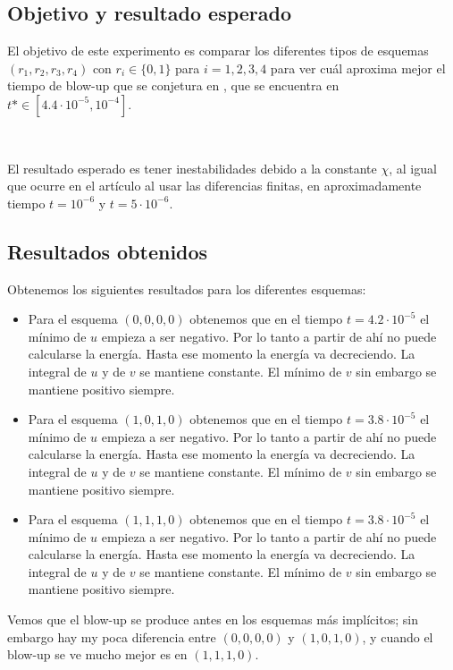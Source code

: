 \documentclass[a4paper,12pt]{article}
\begin{document}
\subsection{Objetivo y resultado esperado}
El objetivo de este experimento es comparar los diferentes tipos de esquemas $(r_1,r_2,r_3,r_4)$ con $r_i\in\{0,1\}$ para $i=1,2,3,4$ para ver cuál aproxima mejor el tiempo de blow-up que se conjetura en \cite{bib:2}, que se encuentra en $t*\in[4.4\cdot 10^{-5},10^{-4}]$.

\
 
El resultado esperado es tener inestabilidades debido a la constante $\chi$, al igual que ocurre en el artículo al usar las diferencias finitas, en  aproximadamente tiempo $t=10^{-6}$ y $t=5\cdot 10^{-6}$. 

\subsection{Resultados obtenidos}
Obtenemos los siguientes resultados para los diferentes esquemas: 
\begin{itemize}
	
	\item Para el esquema $(0,0,0,0)$ obtenemos que en el tiempo $t=4.2\cdot 10^{-5}$ el mínimo de $u$ empieza a ser negativo. Por lo tanto a partir de ahí no puede calcularse la energía. Hasta ese momento la energía va decreciendo. La integral de $u$ y de $v$ se mantiene constante. El mínimo de $v$ sin embargo se mantiene positivo siempre. 
	
	\item Para el esquema $(1,0,1,0)$ obtenemos que en el tiempo $t=3.8\cdot 10^{-5}$ el mínimo de $u$ empieza a ser negativo. Por lo tanto a partir de ahí no puede calcularse la energía. Hasta ese momento la energía va decreciendo. La integral de $u$ y de $v$ se mantiene constante. El mínimo de $v$ sin embargo se mantiene positivo siempre. 
	
	\item Para el esquema $(1,1,1,0)$ obtenemos que en el tiempo $t=3.8\cdot 10^{-5}$ el mínimo de $u$ empieza a ser negativo. Por lo tanto a partir de ahí no puede calcularse la energía. Hasta ese momento la energía va decreciendo. La integral de $u$ y de $v$ se mantiene constante. El mínimo de $v$ sin embargo se mantiene positivo siempre. 
	
\end{itemize}

Vemos que el blow-up se produce antes en los esquemas más implícitos; sin embargo hay my poca diferencia entre $(0,0,0,0)$ y $(1,0,1,0)$, y cuando el blow-up se ve mucho mejor es en $(1,1,1,0)$.  
\end{document}
